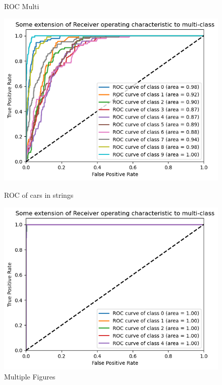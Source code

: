 \documentclass{article}
\begin{document}
\begin{figure}[htbp]
    \centering
    
    \begin{minipage}{\textwidth}
        \centering
        \caption{ROC Multi}
        \includegraphics[scale=0.5]{ROCMulti.png}
    \end{minipage}
    
    \begin{minipage}{\textwidth}
        \centering
        \caption{ROC of cars in strings}
        \includegraphics[scale=0.5]{ROC cars in strings.png}
    \end{minipage}
    
    
    \caption{Multiple Figures}
\end{figure}
\end{document}
